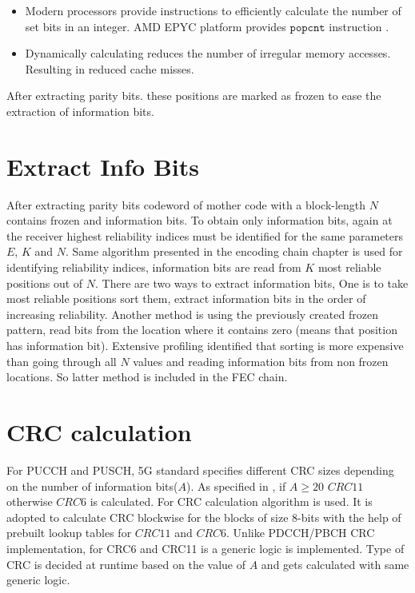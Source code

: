\begin{itemize}  
	\item Modern processors provide instructions to efficiently calculate the number of set bits in an integer. AMD EPYC platform provides $\mathtt{popcnt}$ instruction \cite{AgnerFog}.
	\item Dynamically calculating reduces the number of irregular memory accesses. Resulting in reduced cache misses.
\end{itemize}

After extracting parity bits. these positions are marked as frozen to ease the extraction of information bits.

\section{Extract Info Bits}
After extracting parity bits codeword of mother code with a block-length $N$ contains frozen and information bits. To obtain only information bits, again at the receiver highest reliability indices must be identified for the same parameters $E$, $K$ and $N$. Same algorithm presented in the encoding chain chapter is used for identifying reliability indices, information bits are read from $K$ most reliable positions out of $N$. There are two ways to extract information bits, One is to take most reliable positions sort them, extract information bits in the order of increasing reliability. Another method is using the previously created frozen pattern, read bits from the location where it contains zero (means that position has information bit). Extensive profiling identified that sorting is more expensive than going through all $N$ values and reading information bits from non frozen locations. So latter method is included in the FEC chain.

\section{CRC calculation}
For PUCCH and PUSCH, 5G standard specifies different CRC sizes depending on the number of information bits($A$). As specified in \cite{3gpp.38.212}, if $ A \ge 20$ $ CRC11 $  otherwise $ CRC6 $ is calculated.  For CRC calculation algorithm \cite{Sarwate:1988:CCR:63030.63037} is used. It is adopted to calculate CRC blockwise for the blocks of size 8-bits with the help of prebuilt lookup tables for $ CRC11 $ and $ CRC6 $. Unlike PDCCH/PBCH CRC implementation, for CRC6 and CRC11 is a generic logic is implemented. Type of CRC is decided at runtime based on the value of $A$ and gets calculated with same generic logic.

